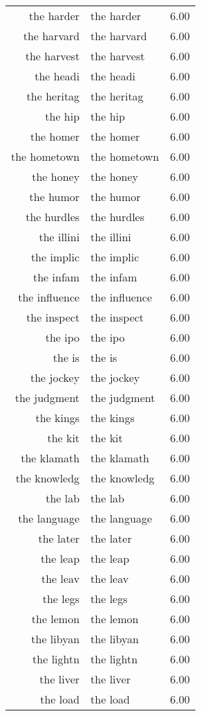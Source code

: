 \begin{table}[ht]
\begin{tabular}{rlr}
  the harder & the harder & 6.00 \\ 
  the harvard & the harvard & 6.00 \\ 
  the harvest & the harvest & 6.00 \\ 
  the headi & the headi & 6.00 \\ 
  the heritag & the heritag & 6.00 \\ 
  the hip & the hip & 6.00 \\ 
  the homer & the homer & 6.00 \\ 
  the hometown & the hometown & 6.00 \\ 
  the honey & the honey & 6.00 \\ 
  the humor & the humor & 6.00 \\ 
  the hurdles & the hurdles & 6.00 \\ 
  the illini & the illini & 6.00 \\ 
  the implic & the implic & 6.00 \\ 
  the infam & the infam & 6.00 \\ 
  the influence & the influence & 6.00 \\ 
  the inspect & the inspect & 6.00 \\ 
  the ipo & the ipo & 6.00 \\ 
  the is & the is & 6.00 \\ 
  the jockey & the jockey & 6.00 \\ 
  the judgment & the judgment & 6.00 \\ 
  the kings & the kings & 6.00 \\ 
  the kit & the kit & 6.00 \\ 
  the klamath & the klamath & 6.00 \\ 
  the knowledg & the knowledg & 6.00 \\ 
  the lab & the lab & 6.00 \\ 
  the language & the language & 6.00 \\ 
  the later & the later & 6.00 \\ 
  the leap & the leap & 6.00 \\ 
  the leav & the leav & 6.00 \\ 
  the legs & the legs & 6.00 \\ 
  the lemon & the lemon & 6.00 \\ 
  the libyan & the libyan & 6.00 \\ 
  the lightn & the lightn & 6.00 \\ 
  the liver & the liver & 6.00 \\ 
  the load & the load & 6.00 \\ 

\end{tabular}
\end{table}

